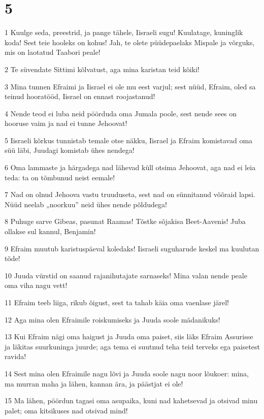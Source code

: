 \chapter{5}

\par 1 Kuulge seda, preestrid, ja pange tähele, Iisraeli sugu! Kuulatage, kuninglik koda! Sest teie hooleks on kohus! Jah, te olete püüdepaelaks Mispale ja võrguks, mis on laotatud Taabori peale!
\par 2 Te süvendate Sittimi kõlvatust, aga mina karistan teid kõiki!
\par 3 Mina tunnen Efraimi ja Iisrael ei ole mu eest varjul; sest nüüd, Efraim, oled sa teinud hooratööd, Iisrael on ennast roojastanud!
\par 4 Nende teod ei luba neid pöörduda oma Jumala poole, sest nende sees on hooruse vaim ja nad ei tunne Jehoovat!
\par 5 Iisraeli kõrkus tunnistab temale otse näkku, Iisrael ja Efraim komistavad oma süü läbi, Juudagi komistab ühes nendega!
\par 6 Oma lammaste ja härgadega nad lähevad küll otsima Jehoovat, aga nad ei leia teda: ta on tõmbunud neist eemale!
\par 7 Nad on olnud Jehoova vastu truuduseta, sest nad on sünnitanud võõraid lapsi. Nüüd neelab „noorkuu” neid ühes nende põldudega!
\par 8 Puhuge sarve Gibeas, pasunat Raamas! Tõstke sõjakisa Beet-Aavenis! Juba ollakse sul kannul, Benjamin!
\par 9 Efraim muutub karistuspäeval koledaks! Iisraeli suguharude keskel ma kuulutan tõde!
\par 10 Juuda vürstid on saanud rajanihutajate sarnaseks! Mina valan nende peale oma viha nagu vett!
\par 11 Efraim teeb liiga, rikub õigust, sest ta tahab käia oma vaenlase järel!
\par 12 Aga mina olen Efraimile roiskumiseks ja Juuda soole mädanikuks!
\par 13 Kui Efraim nägi oma haigust ja Juuda oma paiset, siis läks Efraim Assurisse ja läkitas suurkuninga juurde; aga tema ei suutnud teha teid terveks ega paisetest ravida!
\par 14 Sest mina olen Efraimile nagu lõvi ja Juuda soole nagu noor lõukoer: mina, ma murran maha ja lähen, kannan ära, ja päästjat ei ole!
\par 15 Ma lähen, pöördun tagasi oma asupaika, kuni nad kahetsevad ja otsivad minu palet; oma kitsikuses nad otsivad mind!

